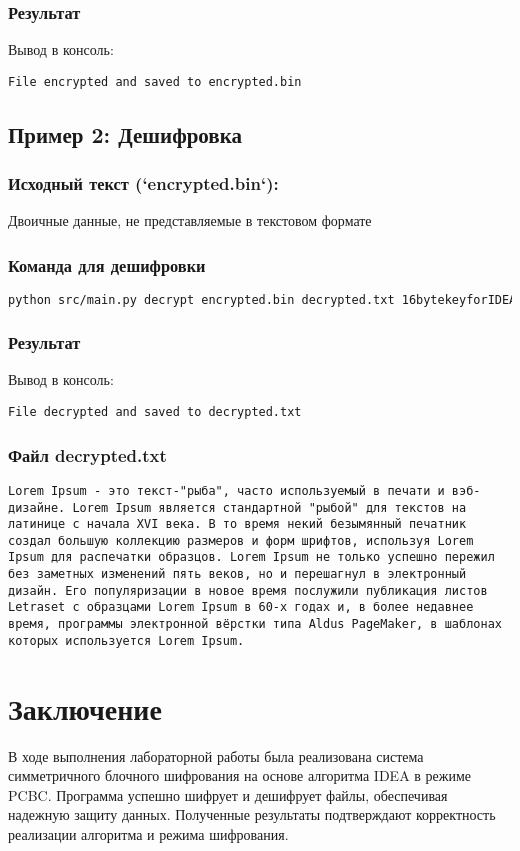 \documentclass[a4paper, 14pt]{report}
\begin{document}
\subsection{Результат}
Вывод в консоль:
\begin{lstlisting}
File encrypted and saved to encrypted.bin
\end{lstlisting}

\section{Пример 2: Дешифровка}

\subsection{Исходный текст (`encrypted.bin`):}
Двоичные данные, не представляемые в текстовом формате


\subsection{Команда для дешифровки}
\begin{lstlisting}[language=bash]
python src/main.py decrypt encrypted.bin decrypted.txt 16bytekeyforIDEA
\end{lstlisting}

\subsection{Результат}
Вывод в консоль:
\begin{lstlisting}
File decrypted and saved to decrypted.txt
\end{lstlisting}

\subsection{Файл decrypted.txt}
\begin{lstlisting}
Lorem Ipsum - это текст-"рыба", часто используемый в печати и вэб-дизайне. Lorem Ipsum является стандартной "рыбой" для текстов на латинице с начала XVI века. В то время некий безымянный печатник создал большую коллекцию размеров и форм шрифтов, используя Lorem Ipsum для распечатки образцов. Lorem Ipsum не только успешно пережил без заметных изменений пять веков, но и перешагнул в электронный дизайн. Его популяризации в новое время послужили публикация листов Letraset с образцами Lorem Ipsum в 60-х годах и, в более недавнее время, программы электронной вёрстки типа Aldus PageMaker, в шаблонах которых используется Lorem Ipsum.
\end{lstlisting}
\chapter{Заключение}
В ходе выполнения лабораторной работы была реализована система симметричного блочного шифрования на основе алгоритма IDEA в режиме PCBC. Программа успешно шифрует и дешифрует файлы, обеспечивая надежную защиту данных. Полученные результаты подтверждают корректность реализации алгоритма и режима шифрования.
\end{document}
